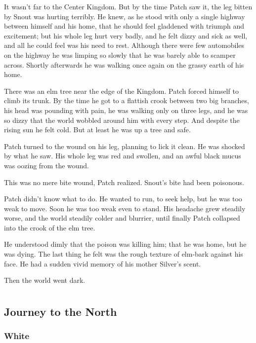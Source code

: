 \documentclass[ebook,oneside,openany,12pt]{memoir}
\begin{document}
It wasn’t far to the Center Kingdom. But by the time Patch saw it, the
leg bitten by Snout was hurting terribly. He knew, as he stood with
only a single highway between himself and his home, that he should
feel gladdened with triumph and excitement; but his whole leg hurt
very badly, and he felt dizzy and sick as well, and all he could feel
was his need to rest. Although there were few automobiles on the
highway he was limping so slowly that he was barely able to scamper
across. Shortly afterwards he was walking once again on the grassy
earth of his home.

There was an elm tree near the edge of the Kingdom. Patch forced
himself to climb its trunk. By the time he got to a flattish crook
between two big branches, his head was pounding with pain, he was
walking only on three legs, and he was so dizzy that the world wobbled
around him with every step. And despite the rising sun he felt
cold. But at least he was up a tree and safe.

Patch turned to the wound on his leg, planning to lick it clean. He
was shocked by what he saw. His whole leg was red and swollen, and an
awful black mucus was oozing from the wound.

This was no mere bite wound, Patch realized. Snout’s bite had been
poisonous.

Patch didn’t know what to do. He wanted to run, to seek help, but he
was too weak to move. Soon he was too weak even to stand. His headache
grew steadily worse, and the world steadily colder and blurrier, until
finally Patch collapsed into the crook of the elm tree.

He understood dimly that the poison was killing him; that he was home,
but he was dying. The last thing he felt was the rough texture of
elm-bark against his face. He had a sudden vivid memory of his mother
Silver’s scent.

Then the world went dark.


\part{}

\chapter{Journey to the North}

\section{White}
\end{document}
